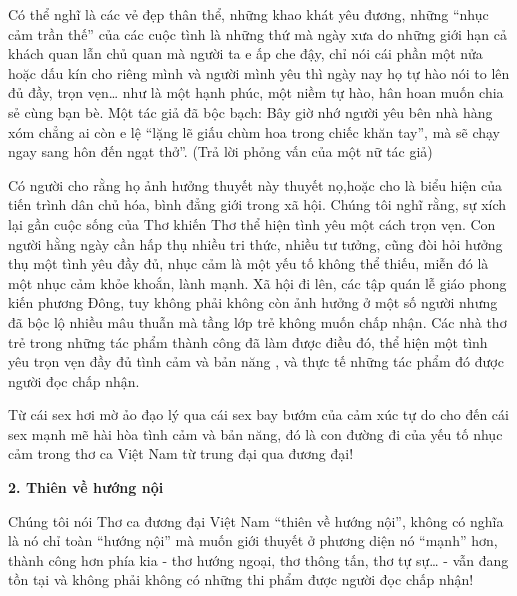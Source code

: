 \documentclass[../main.tex]{subfiles}
\begin{document}
\begin{multicols}{2}
Có thể nghĩ là các vẻ đẹp thân thể, những khao khát yêu đương, những “nhục cảm trần thế” của các cuộc tình là những thứ mà ngày xưa do những giới hạn cả khách quan lẫn chủ quan mà người ta e ấp che đậy, chỉ nói cái phần một nửa hoặc dấu kín cho riêng mình và người mình yêu thì ngày nay họ tự hào nói to lên đủ đầy, trọn vẹn… như là một hạnh phúc, một niềm tự hào, hân hoan muốn chia sẻ cùng bạn bè. Một tác giả đã bộc bạch: Bây giờ nhớ người yêu bên nhà hàng xóm chẳng ai còn e lệ “lặng lẽ giấu chùm hoa trong chiếc khăn tay”, mà sẽ chạy ngay sang hôn đến ngạt thở”. (Trả lời phỏng vấn của một nữ tác giả) 
 
Có người cho rằng họ ảnh hưởng thuyết này thuyết nọ,hoặc cho là  biểu hiện của tiến trình dân chủ hóa, bình đẳng giới trong xã hội. Chúng tôi nghĩ rằng, sự xích lại gần cuộc sống của Thơ khiến Thơ thể hiện tình yêu một cách trọn vẹn. Con người hằng ngày cần hấp thụ nhiều tri thức, nhiều tư tưởng, cũng đòi hỏi hưởng thụ một tình yêu đầy đủ, nhục cảm là một yếu tố không thể thiếu, miễn đó là một nhục cảm  khỏe khoắn, lành mạnh. Xã hội đi lên, các tập quán lễ giáo phong kiến phương Đông, tuy không phải  không còn ảnh hưởng ở một số người nhưng đã bộc lộ nhiều mâu thuẫn mà tầng lớp trẻ không muốn chấp nhận. Các nhà thơ trẻ  trong những tác phẩm thành công đã làm  được điều đó, thể hiện một tình yêu trọn vẹn đầy đủ tình cảm và bản năng , và thực tế những tác phẩm đó được người đọc chấp nhận. 
 
Từ cái sex hơi mờ ảo đạo lý qua cái sex bay bướm của cảm xúc tự do cho đến cái sex mạnh mẽ hài hòa tình cảm và bản năng, đó là con đường đi của yếu tố nhục cảm trong thơ ca Việt Nam từ trung đại qua đương đại! 

 
\textbf{2. Thiên về hướng nội} 
 
Chúng tôi nói Thơ ca đương đại Việt Nam “thiên về hướng nội”, không có nghĩa là nó chỉ toàn  “hướng nội” mà muốn giới thuyết ở phương diện nó “mạnh” hơn, thành công hơn phía kia - thơ hướng ngoại, thơ thông tấn, thơ tự sự… - vẫn đang tồn tại và không phải không có những thi phẩm được người đọc chấp nhận! 
 

\end{multicols}
\end{document}

